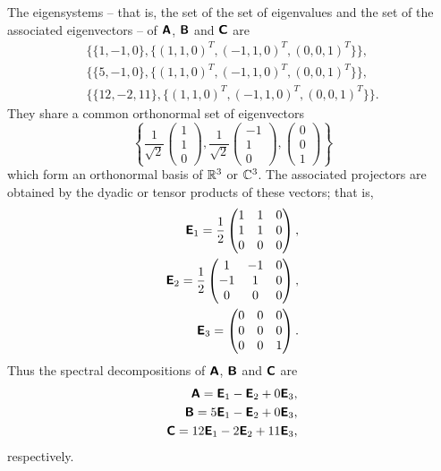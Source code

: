 {The eigensystems -- that is, the set of the set of eigenvalues and the set of the associated eigenvectors -- of $\textsf{\textbf{A}}$,
$\textsf{\textbf{B}}$
and
$\textsf{\textbf{C}}$
are
\begin{equation}
\begin{split}
\{\{1,-1,  0\}, \{(1, 1, 0)^T, (-1, 1, 0)^T, (0, 0, 1)^T\}\} ,\\
\{\{5, -1, 0\},  \{(1, 1, 0)^T, (-1, 1, 0)^T, (0, 0, 1)^T\}\},\\
\{\{12, -2, 11\},  \{(1, 1, 0)^T, (-1, 1, 0)^T, (0, 0, 1)^T\}\}.
\end{split}
\end{equation}
They share a common orthonormal set of eigenvectors
$$
\left\{
\frac{1}{\sqrt{2}}
\begin{pmatrix}
1\\ 1\\ 0
\end{pmatrix},
\frac{1}{\sqrt{2}}
\begin{pmatrix}
-1\\ 1\\ 0
\end{pmatrix},
\begin{pmatrix}
0\\ 0\\ 1\end{pmatrix}
\right\}
$$
which form an orthonormal basis of ${\Bbb R}^3$ or ${\Bbb C}^3$.
The associated projectors are obtained by the dyadic or tensor products of these vectors; that is,
\begin{equation}
\begin{split}
\textsf{\textbf{E}}_1= \frac{1}{2}
\begin{pmatrix}
1& 1& 0\\
1& 1& 0\\
0& 0& 0
\end{pmatrix},\\
\textsf{\textbf{E}}_2= \frac{1}{2}
\begin{pmatrix}
1& -1& 0\\
-1& 1& 0\\
0& 0& 0
\end{pmatrix},\\
\textsf{\textbf{E}}_3=
\begin{pmatrix}
0& 0& 0\\
0& 0& 0\\
0& 0& 1
\end{pmatrix}.
\end{split}
\end{equation}
Thus the spectral decompositions of
$\textsf{\textbf{A}}$,
$\textsf{\textbf{B}}$  and
$\textsf{\textbf{C}}$ are
\begin{equation}
\begin{split}
\textsf{\textbf{A}}= \textsf{\textbf{E}}_1  - \textsf{\textbf{E}}_2  + 0  \textsf{\textbf{E}}_3,\\
\textsf{\textbf{B}}= 5\textsf{\textbf{E}}_1  - \textsf{\textbf{E}}_2  + 0 \textsf{\textbf{E}}_3,\\
\textsf{\textbf{C}}= 12\textsf{\textbf{E}}_1  -2 \textsf{\textbf{E}}_2  + 11\textsf{\textbf{E}}_3,
\end{split}
\label{2011-m-empc}
\end{equation}
respectively.


}
